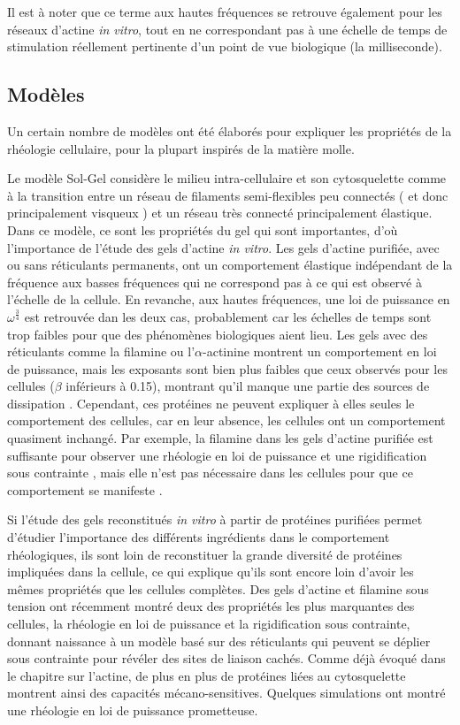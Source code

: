 Il est à noter que ce terme aux hautes fréquences se retrouve également pour les réseaux d'actine \textit{in vitro}, tout en ne correspondant pas à une échelle de temps de stimulation réellement pertinente d'un point de vue biologique (la milliseconde). 




\subsection{Modèles}

Un certain nombre de modèles ont été élaborés pour expliquer les propriétés de la rhéologie cellulaire, pour la plupart inspirés de la matière molle. 

Le modèle Sol-Gel considère le milieu intra-cellulaire et son cytosquelette comme à la transition entre un réseau de filaments semi-flexibles peu connectés ( et donc principalement visqueux ) et un réseau très connecté principalement élastique. 
Dans ce modèle, ce sont les propriétés du gel qui sont importantes,  d'où l'importance de l'étude des gels d'actine \textit{in vitro}. 
Les gels d'actine purifiée, avec ou sans réticulants permanents, ont un comportement élastique indépendant de la fréquence aux basses fréquences qui ne correspond pas à ce qui est observé à l'échelle de la cellule. 
En revanche, aux hautes fréquences, une loi de puissance en $\omega^{\frac{3}{4}}$ est retrouvée dan les deux cas, probablement car les échelles de temps sont trop faibles pour que des phénomènes biologiques aient lieu. 
Les gels avec des réticulants comme la filamine ou l'$\alpha$-actinine montrent un comportement en loi de puissance, mais les exposants sont bien plus faibles que ceux observés pour les cellules ($\beta$ inférieurs à 0.15), montrant qu'il manque une partie des sources de dissipation \parencite{gardel_stress-dependent_2006}.
Cependant, ces protéines ne peuvent expliquer à elles seules le comportement des cellules, car en leur absence, les cellules ont un comportement quasiment inchangé. Par exemple, la filamine dans les gels d'actine purifiée est suffisante pour observer une rhéologie en loi de puissance et une rigidification sous contrainte \parencite{gardel_stress-dependent_2006}, mais elle n'est pas nécessaire dans les cellules pour que ce comportement se manifeste \parencite{coughlin_filamin-and_2006}.

Si l'étude des gels reconstitués \textit{in vitro} à partir de protéines purifiées permet d'étudier l'importance des différents ingrédients dans le comportement rhéologiques, ils sont loin de reconstituer la grande diversité de protéines impliquées dans la cellule, ce qui explique qu'ils sont encore loin d'avoir les mêmes propriétés que les cellules complètes. 
Des gels d'actine et filamine sous tension ont récemment montré deux des propriétés les plus marquantes des cellules, la rhéologie en loi de puissance et la rigidification sous contrainte, donnant naissance à un modèle basé sur des réticulants qui peuvent se déplier sous contrainte pour révéler des sites de liaison cachés. Comme déjà évoqué dans le chapitre sur l'actine, de plus en plus de protéines liées au cytosquelette montrent ainsi des capacités mécano-sensitives. Quelques simulations ont montré une rhéologie en loi de puissance prometteuse. 

